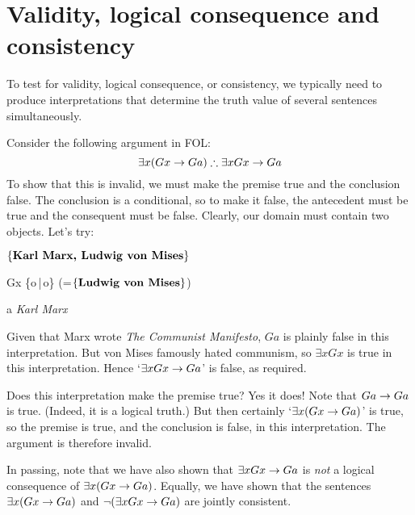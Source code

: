 
\section{Validity, logical consequence and consistency}
To test for validity, logical consequence, or consistency, we typically need to produce interpretations that determine the truth value of several sentences simultaneously.

Consider the following argument in FOL:
$$\exists x(Gx \eif Ga) \therefore \exists x Gx \eif Ga$$
To show that this is invalid, we must make the premise true and the conclusion false. The conclusion is a conditional, so to make it false, the antecedent must be true and the consequent must be false. Clearly, our domain must contain two objects. Let's try:
	\begin{ekey}
		\item[\text{domain}] $\{\text{\emph{Karl Marx, Ludwig von Mises}}\}$
		\item[Gx] \{o\,|\,o\} (=$\{\emph{Ludwig von Mises}\}$)
		\item[a] \emph{Karl Marx}
	\end{ekey}
Given that Marx wrote \emph{The Communist Manifesto}, $Ga$ is plainly false in this interpretation. But von Mises famously hated communism, so $\exists x Gx$ is true in this interpretation. Hence `$\exists x Gx \eif Ga$' is false, as required.

Does this interpretation make the premise true? Yes it does! Note that $Ga \eif Ga$ is true. (Indeed, it is a logical truth.) But then certainly `$\exists x (Gx \eif Ga)$' is true, so the premise is true, and the conclusion is false, in this interpretation. The argument is therefore invalid.

In passing, note that we have also shown that $\exists x Gx \eif Ga$ is \emph{not} a logical consequence of $\exists x(Gx \eif Ga)$. Equally, we have shown that the sentences $\exists x (Gx \eif Ga)$ and $\enot (\exists x Gx \eif Ga)$ are jointly consistent.

